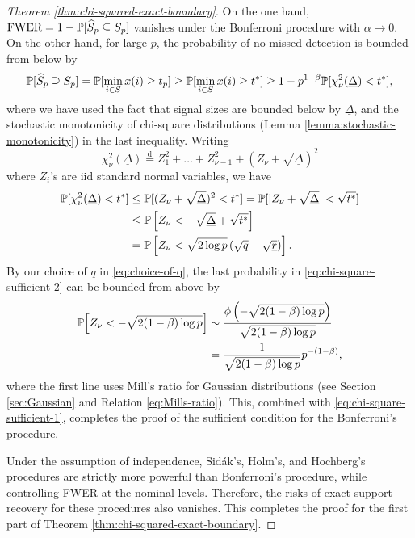 \begin{proof}[Theorem \ref{thm:chi-squared-exact-boundary}]
On the one hand, $\text{FWER} = 1 - \P[\widehat{S}_p \subseteq S_p]$ vanishes under the Bonferroni procedure with $\alpha\to0$.
On the other hand, for large $p$, the probability of no missed detection is bounded from below by
\begin{equation} \label{eq:chi-square-sufficient-1}
    \P[\widehat{S}_p \supseteq S_p] 
    = \P[\min_{i\in S} x(i) \ge t_p] 
    \ge \P[\min_{i\in S} x(i) \ge t^*] 
    \ge 1 - p^{1-\beta}\P[\chi_\nu^2(\underline{\Delta}) < t^*],
\end{equation}
where we have used the fact that signal sizes are bounded below by $\underline{\Delta}$, and the stochastic monotonicity of chi-square distributions (Lemma \ref{lemma:stochastic-monotonicity}) in the last inequality.
Writing
$$
\chi_\nu^2(\underline{\Delta}) \stackrel{\mathrm{d}}{=} Z_1^2 + \ldots + Z_{\nu-1}^2 + (Z_\nu + \sqrt{\underline{\Delta}})^2
$$
where $Z_i$'s are iid standard normal variables, we have
\begin{align}
    \P[\chi_\nu^2({\underline{\Delta}}) < t^*]
    &\le \P[(Z_\nu+\sqrt{\underline{\Delta}})^2 < t^*] 
    = \P[|Z_\nu+\sqrt{\underline{\Delta}}| < \sqrt{t^*}]  \nonumber \\
    &\le \P\left[Z_\nu < - \sqrt{\underline{\Delta}} +  \sqrt{t^*}\right] \nonumber \\
    &= \P\left[Z_\nu < \sqrt{2\log{p}}\left(\sqrt{q} - \sqrt{\underline{r}}\right)\right]. \label{eq:chi-square-sufficient-2}
\end{align}
By our choice of $q$ in \eqref{eq:choice-of-q}, the last probability in \eqref{eq:chi-square-sufficient-2} can be bounded from above by 
\begin{align*}
    \P\Big[Z_\nu < -\sqrt{2(1-\beta)\log{p}}\Big]
    &\sim \frac{\phi\left(-\sqrt{2(1-\beta)\log{p}}\right)}{\sqrt{2(1-\beta)\log{p}}} \\
    &= \frac{1}{\sqrt{2(1-\beta)\log{p}}}p^{-(1-\beta)},
\end{align*}
where the first line uses Mill's ratio for Gaussian distributions (see Section \ref{sec:Gaussian} and Relation \eqref{eq:Mills-ratio}).
This, combined with \eqref{eq:chi-square-sufficient-1}, completes the proof of the sufficient condition for the Bonferroni's procedure.

Under the assumption of independence, Sid\'ak's, Holm's, and Hochberg's procedures are strictly more powerful than Bonferroni's procedure, while controlling FWER at the nominal levels.
Therefore, the risks of exact support recovery for these procedures also vanishes.
This completes the proof for the first part of Theorem \ref{thm:chi-squared-exact-boundary}.


\end{proof}
